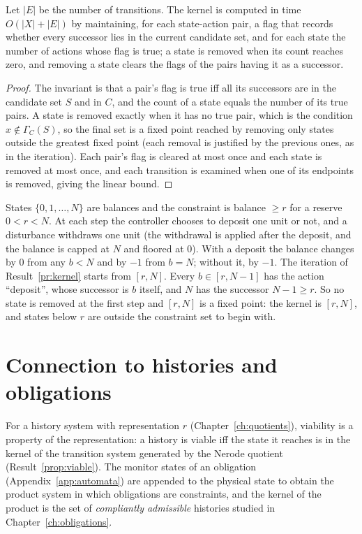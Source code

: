 \begin{newresult}\label{pr:kernel-alg}
Let $|E|$ be the number of transitions. The kernel is computed in time $O(|X|+|E|)$ by maintaining, for each state-action pair, a flag that records whether every successor lies in the current candidate set, and for each state the number of actions whose flag is true; a state is removed when its count reaches zero, and removing a state clears the flags of the pairs having it as a successor.
\end{newresult}
\begin{proof}
The invariant is that a pair's flag is true iff all its successors are in the candidate set $S$ and in $C$, and the count of a state equals the number of its true pairs. A state is removed exactly when it has no true pair, which is the condition $x\notin\Gamma_C(S)$, so the final set is a fixed point reached by removing only states outside the greatest fixed point (each removal is justified by the previous ones, as in the iteration). Each pair's flag is cleared at most once and each state is removed at most once, and each transition is examined when one of its endpoints is removed, giving the linear bound.
\end{proof}

\begin{example}\label{pr:ex-account}
States $\{0,1,\dots,N\}$ are balances and the constraint is balance $\ge r$ for a reserve $0<r<N$. At each step the controller chooses to deposit one unit or not, and a disturbance withdraws one unit (the withdrawal is applied after the deposit, and the balance is capped at $N$ and floored at $0$). With a deposit the balance changes by $0$ from any $b<N$ and by $-1$ from $b=N$; without it, by $-1$. The iteration of Result~\ref{pr:kernel} starts from $[r,N]$. Every $b\in[r,N-1]$ has the action ``deposit'', whose successor is $b$ itself, and $N$ has the successor $N-1\ge r$. So no state is removed at the first step and $[r,N]$ is a fixed point: the kernel is $[r,N]$, and states below $r$ are outside the constraint set to begin with.
\end{example}

\section{Connection to histories and obligations}

For a history system with representation $r$ (Chapter~\ref{ch:quotients}), viability is a property of the representation: a history is viable iff the state it reaches is in the kernel of the transition system generated by the Nerode quotient (Result~\ref{prop:viable}). The monitor states of an obligation (Appendix~\ref{app:automata}) are appended to the physical state to obtain the product system in which obligations are constraints, and the kernel of the product is the set of \emph{compliantly admissible} histories studied in Chapter~\ref{ch:obligations}.

